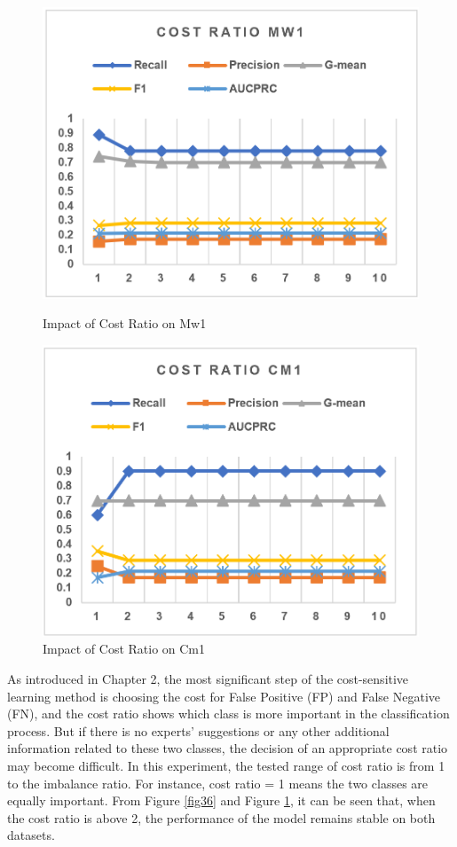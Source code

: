 \begin{figure}[H]
    \centering 
    \begin{minipage}{0.45\textwidth}
        \includegraphics[width=\textwidth]{images/fig36}
        \caption{Impact of Cost Ratio on Mw1}
        \label{fig36}
    \end{minipage}
    \quad
    \begin{minipage}{0.45\textwidth}
        \includegraphics[width=\textwidth]{images/fig37}
        \caption{Impact of Cost Ratio on Cm1}
        \label{fig37}
    \end{minipage}
\end{figure}

As introduced in Chapter 2, the most significant step of the cost-sensitive learning method is choosing the cost for False Positive (FP) and False Negative (FN), and the cost ratio shows which class is more important in the classification process. But if there is no experts' suggestions or any other additional information related to these two classes, the decision of an appropriate cost ratio may become difficult. In this experiment, the tested range of cost ratio is from 1 to the imbalance ratio. For instance, cost ratio = 1 means the two classes are equally important. From Figure \ref{fig36} and Figure \ref{fig37}, it can be seen that, when the cost ratio is above 2, the performance of the model remains stable on both datasets. 
